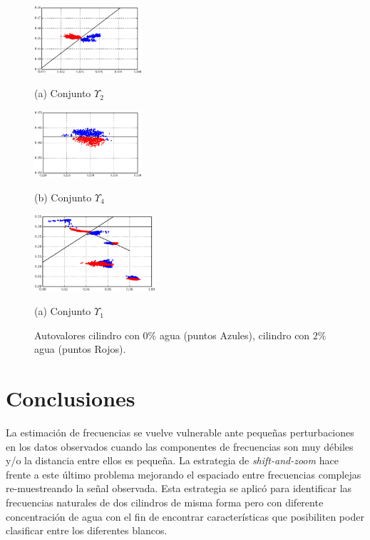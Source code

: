 	\begin{figure}[ht]
		\begin{minipage}[b]{.48\linewidth}
			\centering
			\centerline{\includegraphics[width=4.0cm]{Figuras/set2}}
			\centerline{(a) Conjunto $\varUpsilon_2$}\medskip
		\end{minipage}
		\hfill
		\begin{minipage}[b]{0.48\linewidth}
			\centering
			\centerline{\includegraphics[width=4.0cm]{Figuras/set5}}
			\centerline{(b) Conjunto $\varUpsilon_4$}\medskip
		\end{minipage}
		\begin{minipage}[b]{1.0\linewidth}
			\centering
			\centerline{\includegraphics[width=4.5cm]{Figuras/set1}}
			\centerline{(a) Conjunto $\varUpsilon_1$}\medskip
		\end{minipage}
		\caption{Autovalores cilindro con $0\%$ agua (puntos Azules), cilindro con $2\%$ agua (puntos Rojos).}
		\label{Fig:Avas_cilSecoHumedo}
	\end{figure}
	
	\section{Conclusiones}
	
		La estimación de frecuencias se vuelve vulnerable ante pequeñas perturbaciones en los datos observados cuando las componentes de frecuencias son  muy débiles y/o la distancia entre ellos es pequeña. La estrategia de \emph{shift-and-zoom} hace frente a este último problema mejorando el espaciado entre frecuencias complejas re-muestreando la señal observada. Esta estrategia se aplicó para identificar las frecuencias naturales de dos cilindros de misma forma pero con diferente concentración de agua con el fin de encontrar características que posibiliten poder clasificar entre los diferentes blancos.
		
		
	




